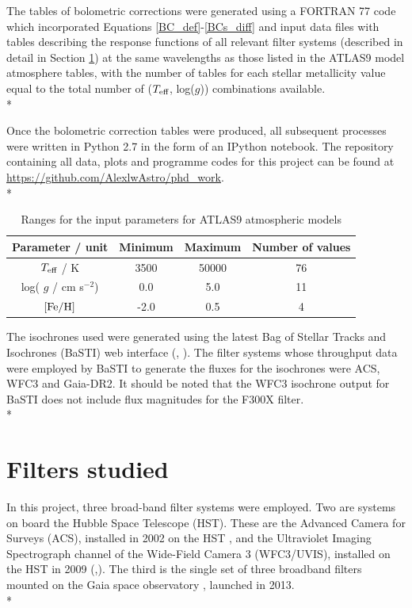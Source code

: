 \documentclass[12pt, a4paper]{report}
\begin{document}
The tables of bolometric corrections were generated using a FORTRAN 77 code which incorporated Equations \ref{BC_def}-\ref{BCs_diff} and input data files with tables describing the response functions of all relevant filter systems (described in detail in Section \ref{filter_desc}) at the same wavelengths as those listed in the ATLAS9 model atmosphere tables, with the number of tables for each stellar metallicity value equal to the total number of ($T_{\textnormal{eff}}$, log($g$)) combinations available.\\*

Once the bolometric correction tables were produced, all subsequent processes were written in Python 2.7 in the form of an IPython notebook. The repository containing all data, plots and programme codes for this project can be found at \protect\url{https://github.com/AlexlwAstro/phd_work}.\\*


\begin{table}
\begin{center}
\begin{tabular}{cccc}
\hline
Parameter / unit & Minimum & Maximum & Number of values \\
\hline
$T_{\textnormal{eff}}$ / K & 3500 & 50000 & 76 \\
log( $g$ / cm s$^{-2}$) & 0.0 & 5.0 & 11 \\
$\textnormal{[Fe/H]}$ & -2.0 & 0.5 & 4 \\
\hline
\end{tabular}
\caption{Ranges for the input parameters for ATLAS9 atmospheric models}
\label{atlas9_input}
\end{center}
\end{table}

The isochrones used were generated using the latest Bag of Stellar Tracks and Isochrones (BaSTI) web interface (\cite{2004ApJ...612..168P}, \cite{2018ApJ...856..125H}). The filter systems whose throughput data were employed by BaSTI to generate the fluxes for the isochrones were ACS, WFC3 and Gaia-DR2. It should be noted that the WFC3 isochrone output for BaSTI does not include flux magnitudes for the F300X filter.\\*

\section{Filters studied} \label{filter_desc}
In this project, three broad-band filter systems were employed. Two are systems on board the Hubble Space Telescope (HST). These are the Advanced Camera for Surveys (ACS), installed in 2002 on the HST \citep{2007AJ....133.1658S}, and the Ultraviolet Imaging Spectrograph channel of the Wide-Field Camera 3 (WFC3/UVIS), installed on the HST in 2009 (\cite{2010wfc..rept...14K},\cite{2010SPIE.7731E..0ZM}). The third is the single set of three broadband filters mounted on the Gaia space observatory  \citep{2010A&A...523A..48J}, launched in 2013. \\*
\end{document}

